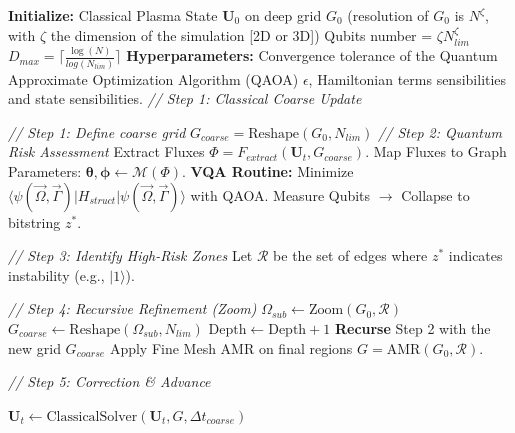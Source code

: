 \documentclass[12pt, a4paper, oneside]{report}
\begin{document}
\begin{algorithm}[H]
\caption{Q-HAS: Time-Stepping Loop}
\begin{algorithmic}[1]
\State \textbf{Initialize:} Classical Plasma State $\mathbf{U}_0$ on deep grid $G_0$ (resolution of $G_0$ is $N^{\zeta}$, with $\zeta$ the dimension of the simulation [2D or 3D])
\State Qubits number = $\zeta N_{lim}^{\zeta}$ 
\State $D_{max}= \lceil\frac{\log(N)}{log(N_{lim})}\rceil$
\State \textbf{Hyperparameters:} Convergence tolerance of the Quantum Approximate Optimization Algorithm (QAOA) $\epsilon$, Hamiltonian terms sensibilities and state sensibilities.
    \State \textit{// Step 1: Classical Coarse Update}
    
        \State \textit{// Step 1: Define coarse grid} 
        \State $G_{coarse}= \text{Reshape}(G_0, N_{lim})$
        \State \textit{// Step 2: Quantum Risk Assessment}
        \State Extract Fluxes $\Phi = F_{extract}(\mathbf{U}_{t},G_{coarse})$.
        \State Map Fluxes to Graph Parameters: $\mathbf{\theta, \phi} \leftarrow \mathcal{M}(\Phi)$.
        \State \textbf{VQA Routine:}
        \State \quad Minimize $\langle\psi(\vec{\Omega}, \vec{\Gamma})| H_{struct}|\psi(\vec{\Omega}, \vec{\Gamma})\rangle$ with QAOA.
        \State \quad Measure Qubits $\to$ Collapse to bitstring $z^*$.
        
        \State \textit{// Step 3: Identify High-Risk Zones}
        \State Let $\mathcal{R}$ be the set of edges where $z^*$ indicates instability (e.g., $|1\rangle$).
        
        \State \textit{// Step 4: Recursive Refinement (Zoom)}
            \State $\Omega_{sub} \leftarrow \text{Zoom}(G_0, \mathcal{R})$ 
            \State $G_{coarse} \leftarrow \text{Reshape}(\Omega_{sub}, N_{lim})$ 
            \State $\text{Depth} \leftarrow \text{Depth} + 1$
            \State \textbf{Recurse} Step 2 with the new grid $G_{coarse}$
        \EndIf
        \State Apply Fine Mesh AMR on final regions $G =\text{AMR}(G_0, \mathcal{R}) $.
    \EndIf
    
    \State \textit{// Step 5: Correction \& Advance}
    
    \State $\mathbf{U}_{t} \leftarrow \text{ClassicalSolver}(\mathbf{U}_t, G,  \Delta t_{coarse})$
\EndFor
\end{algorithmic}
\end{algorithm}
\end{document}
